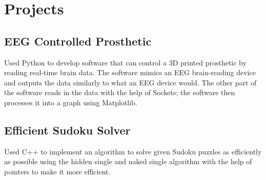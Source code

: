 \documentclass{article}
\begin{document}
\noindent
\begin{minipage}[t]{1\textwidth}
    \section{Projects}
    \subsection{EEG Controlled Prosthetic}
    \vspace{-0.5em} %
    \normalsize{Used Python to develop software that can control a 3D printed
    prosthetic by reading real-time brain data. The software mimics
    an EEG brain-reading device and outputs the data similarly to
    what an EEG device would. The other part of the software reads
    in the data with the help of Sockets; the software then processes
    it into a graph using Matplotlib.}
    \vspace{0.5em} %

    \subsection{Efficient Sudoku Solver}
    \vspace{-0.5em} %
    \normalsize{Used C++ to implement an algorithm to solve given Sudoku puzzles as efficiently as possible using the hidden single and naked
    single algorithm with the help of pointers to make it more efficient.}
    \vspace{0.5em} %
\end{minipage}

\hfill
\end{document}

